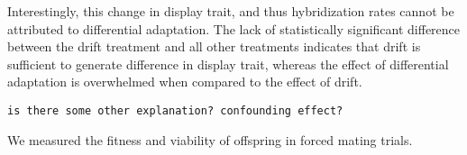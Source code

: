 Interestingly, this change in display trait, and thus hybridization rates cannot be attributed to differential adaptation. 
The lack of statistically significant difference between the drift treatment and all other treatments indicates that drift is sufficient to generate difference in display trait, whereas the effect of differential adaptation is overwhelmed when compared to the effect of drift.

\verb|is there some other explanation? confounding effect?|

We measured the fitness and viability of offspring in forced mating trials.




